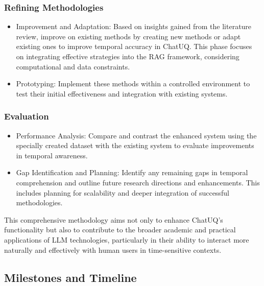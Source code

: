 \subsubsection{Refining Methodologies}

\begin{itemize}
    \item Improvement and Adaptation: Based on insights gained from the literature review, improve on existing methods by creating new methods or adapt existing ones to improve temporal accuracy in ChatUQ. This phase focuses on integrating effective strategies into the RAG framework, considering computational and data constraints.
    \item Prototyping: Implement these methods within a controlled environment to test their initial effectiveness and integration with existing systems.
\end{itemize}

\subsubsection{Evaluation}

\begin{itemize}
    \item Performance Analysis: Compare and contrast the enhanced system using the specially created dataset with the existing system to evaluate improvements in temporal awareness.
    \item Gap Identification and Planning: Identify any remaining gaps in temporal comprehension and outline future research directions and enhancements. This includes planning for scalability and deeper integration of successful methodologies.
\end{itemize}

This comprehensive methodology aims not only to enhance ChatUQ's functionality but also to contribute to the broader academic and practical applications of LLM technologies, particularly in their ability to interact more naturally and effectively with human users in time-sensitive contexts.

\subsection{Milestones and Timeline}


